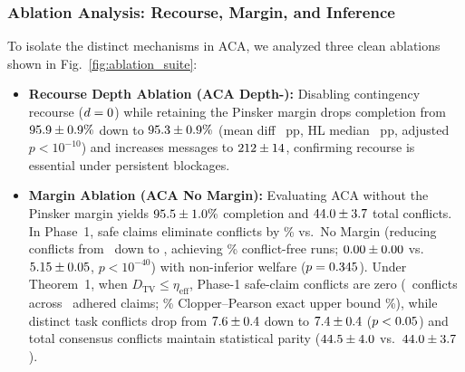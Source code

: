 \documentclass[lettersize,journal]{IEEEtran}
\begin{document}
\subsubsection{Ablation Analysis: Recourse, Margin, and Inference}
To isolate the distinct mechanisms in ACA, we analyzed three clean ablations shown in Fig.~\ref{fig:ablation_suite}:
\begin{itemize}[leftmargin=*,itemsep=0pt,topsep=1pt,parsep=0pt]
    \item \textbf{Recourse Depth Ablation (ACA Depth-\aeRecourseDepthZero):} Disabling contingency recourse ($d = 0$) while retaining the Pinsker margin drops completion from $95.9 \pm 0.9\%$ down to $95.3 \pm 0.9\%$ (mean diff \aeHoneMeanDiff~pp, HL median \aeHoneHlMedian~pp, adjusted $p < 10^{-10}$) and increases messages to $212 \pm 14$, confirming recourse is essential under persistent blockages.
    \item \textbf{Margin Ablation (ACA No Margin):} Evaluating ACA without the Pinsker margin yields $95.5 \pm 1.0\%$ completion and $44.0 \pm 3.7$ total conflicts. In Phase~1, safe claims eliminate conflicts by \aeHfourSafeConflictReductionPct\% vs.\ No Margin (reducing conflicts from \aeNoMarginSafeConflicts\ down to \aeTotalSafeConflicts, achieving \aeConflictFreeRunPct\% conflict-free runs; $0.00 \pm 0.00$ vs.\ $5.15 \pm 0.05$, $p < 10^{-40}$) with non-inferior welfare ($p = 0.345$). Under Theorem~1, when $D_{\mathrm{TV}} \le \eta_{\mathrm{eff}}$, Phase-1 safe-claim conflicts are zero (\aeTheoremConflicts\ conflicts across \aeSafeClaimsAdhered\ adhered claims; \aeConfidenceLevel\% Clopper--Pearson exact upper bound \aeTheoremConflictRateUpper\%), while distinct task conflicts drop from $7.6 \pm 0.4$ down to $7.4 \pm 0.4$ ($p < 0.05$) and total consensus conflicts maintain statistical parity ($44.5 \pm 4.0$ vs.\ $44.0 \pm 3.7$).

\end{itemize}
\end{document}
